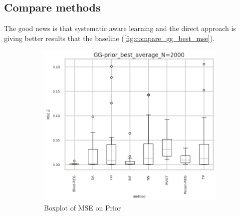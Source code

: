 








\subsection{Compare methods} %
\label{sub:compare_methods}


The good news is that systematic aware learning and the direct approach is giving better results that the baseline (\autoref{fig:compare_gg_best_mse}).

\begin{figure}[ht!]
  \centering
  \begin{subfigure}[t]{0.49\linewidth}
    \includegraphics[width=\linewidth]{COMPARE/GG-prior/BEST_MSE/GG-prior_best_average_N=2000-boxplot_mse.png}
    \caption{Boxplot of MSE on Prior}
  \end{subfigure}%
  \hfill
  \begin{subfigure}[t]{0.49\linewidth}

\end{subfigure}
\end{figure}
